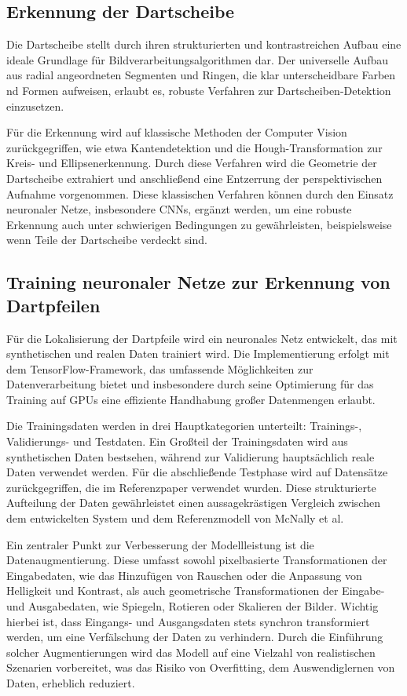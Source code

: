 \subsection{Erkennung der Dartscheibe}
\label{sec:implementierung:dartscheibe}

Die Dartscheibe stellt durch ihren strukturierten und kontrastreichen Aufbau eine ideale Grundlage für Bildverarbeitungsalgorithmen dar. Der universelle Aufbau aus radial angeordneten Segmenten und Ringen, die klar unterscheidbare Farben nd Formen aufweisen, erlaubt es, robuste Verfahren zur Dartscheiben-Detektion einzusetzen.

Für die Erkennung wird auf klassische Methoden der Computer Vision zurückgegriffen, wie etwa Kantendetektion und die Hough-Transformation zur Kreis- und Ellipsenerkennung. Durch diese Verfahren wird die Geometrie der Dartscheibe extrahiert und anschließend eine Entzerrung der perspektivischen Aufnahme vorgenommen. Diese klassischen Verfahren können durch den Einsatz neuronaler Netze, insbesondere CNNs, ergänzt werden, um eine robuste Erkennung auch unter schwierigen Bedingungen zu gewährleisten, beispielsweise wenn Teile der Dartscheibe verdeckt sind.

\subsection{Training neuronaler Netze zur Erkennung von Dartpfeilen}
\label{sec:implementierung:ki}

Für die Lokalisierung der Dartpfeile wird ein neuronales Netz entwickelt, das mit synthetischen und realen Daten trainiert wird. Die Implementierung erfolgt mit dem TensorFlow-Framework, das umfassende Möglichkeiten zur Datenverarbeitung bietet und insbesondere durch seine Optimierung für das Training auf GPUs eine effiziente Handhabung großer Datenmengen erlaubt.

Die Trainingsdaten werden in drei Hauptkategorien unterteilt: Trainings-, Validierungs- und Testdaten.
Ein Großteil der Trainingsdaten wird aus synthetischen Daten bestsehen, während zur Validierung hauptsächlich reale Daten verwendet werden. Für die abschließende Testphase wird auf Datensätze zurückgegriffen, die im Referenzpaper verwendet wurden. Diese strukturierte Aufteilung der Daten gewährleistet einen aussagekrästigen Vergleich zwischen dem entwickelten System und dem Referenzmodell von McNally et al.

Ein zentraler Punkt zur Verbesserung der Modellleistung ist die Datenaugmentierung. Diese umfasst sowohl pixelbasierte Transformationen der Eingabedaten, wie das Hinzufügen von Rauschen oder die Anpassung von Helligkeit und Kontrast, als auch geometrische Transformationen der Eingabe- und Ausgabedaten, wie Spiegeln, Rotieren oder Skalieren der Bilder. Wichtig hierbei ist, dass Eingangs- und Ausgangsdaten stets synchron transformiert werden, um eine Verfälschung der Daten zu verhindern. Durch die Einführung solcher Augmentierungen wird das Modell auf eine Vielzahl von realistischen Szenarien vorbereitet, was das Risiko von Overfitting, dem Auswendiglernen von Daten, erheblich reduziert.

